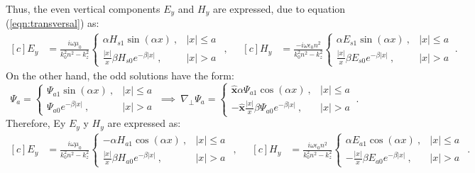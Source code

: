 Thus, the even vertical components $E_y$ and $H_y$ are expressed, due to equation  (\ref{eqn:transversal}) as:
\begin{equation*}
	\begin{aligned}[c]
	 E_y &= \frac{i \omega\mu_0}{k_0^2n^2-k_z^2} \left\{\begin{matrix}
	 \alpha H_{s1}\sin(\alpha x) \ ,	 & |x|\le a
	 \\
	 \frac{|x|}{x}\beta H_{s0}e^{-\beta|x|} \ , & |x|>a
	 \end{matrix}\right.
\end{aligned} 
,\quad
	\begin{aligned}[c]
	 H_y &= \frac{-i\omega \epsilon_0 n^2}{k_0^2n^2-k_z^2} \left\{\begin{matrix}
	 \alpha E_{s1}\sin(\alpha x) \ ,	& |x|\le a
	 \\
	 \frac{|x|}{x}\beta E_{s0}e^{-\beta|x|} \ , & |x|>a
	 \end{matrix}\right.
	 \
	 .
\end{aligned} 
\end{equation*}
On the other hand, the odd solutions have the form:
\begin{equation*}
	\Psi_a = \left\{\begin{matrix}
	\Psi_{a1}\sin(\alpha x) \ , & |x|\le a
	\\
	\Psi_{a0}e^{-\beta|x|} \ , & |x|>a
	\end{matrix}\right.
	\
	\implies
	\
		\nabla_\perp \Psi_a = \left\{\begin{matrix}
	\hat{\textbf{x}}\alpha\Psi_{a1}\cos(\alpha x) \ , & |x|\le a
	\\
	-\hat{\textbf{x}}\frac{|x|}{x}\beta\Psi_{a0}e^{-\beta|x|} \ , & |x|>a
	\end{matrix}\right.
	\
	.
\end{equation*}
Therefore, Ey $E_y$ y $H_y$ are expressed as:
\begin{equation*}
	\begin{aligned}[c]
	 E_y &= \frac{i\omega\mu_0}{k_0^2n^2-k_z^2} \left\{\begin{matrix}
	 -\alpha H_{a1}\cos(\alpha x) \ , & |x|\le a
	 \\
	 \frac{|x|}{x}\beta H_{a0}e^{-\beta|x|} \ , & |x|>a
	 \end{matrix}\right.
\end{aligned} 
,\quad
	\begin{aligned}[c]
	 H_y &= \frac{i\omega \epsilon_0 n^2}{k_0^2n^2-k_z^2} \left\{\begin{matrix}
	  \alpha E_{a1}\cos(\alpha x) \ ,	 & |x|\le a
	 \\
	 -\frac{|x|}{x}\beta E_{a0}e^{-\beta|x|} \ , & |x|>a
	 \end{matrix}\right.
\end{aligned} .
\end{equation*}
